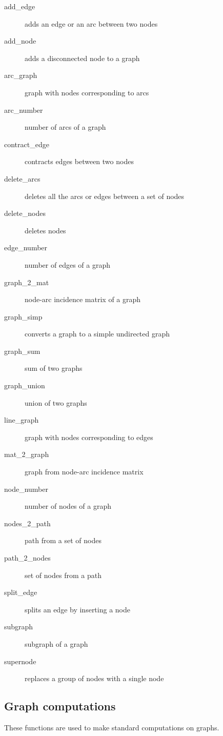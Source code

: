 \documentclass[11pt]{article}
\begin{document}
\begin{description}
\item[add\_edge] adds an edge or an arc between two nodes
\item[add\_node] adds a disconnected node to a graph
\item[arc\_graph] graph with nodes corresponding to arcs
\item[arc\_number] number of arcs of a graph
\item[contract\_edge] contracts edges between two nodes
\item[delete\_arcs] deletes all the arcs or edges between a set of nodes
\item[delete\_nodes] deletes nodes
\item[edge\_number] number of edges of a graph
\item[graph\_2\_mat] node-arc incidence matrix of a graph
\item[graph\_simp] converts a graph to a simple undirected graph
\item[graph\_sum] sum of two graphs
\item[graph\_union] union of two graphs
\item[line\_graph] graph with nodes corresponding to edges
\item[mat\_2\_graph] graph from node-arc incidence matrix
\item[node\_number] number of nodes of a graph
\item[nodes\_2\_path] path from a set of nodes
\item[path\_2\_nodes] set of nodes from a path
\item[split\_edge] splits an edge by inserting a node
\item[subgraph] subgraph of a graph 
\item[supernode] replaces a group of nodes with a single node
\end{description}

\subsection{Graph computations}

These functions are used to make standard computations on graphs.
\end{document}
